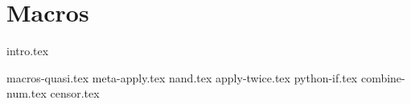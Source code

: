 \documentclass{exam}
\begin{document}
\vspace{5mm}

\section{Macros}
{intro.tex}
\begin{questions}
{macros-quasi.tex}
{meta-apply.tex}
{nand.tex}
{apply-twice.tex}
{python-if.tex}
{combine-num.tex}
{censor.tex}
\end{questions}
\end{document}
